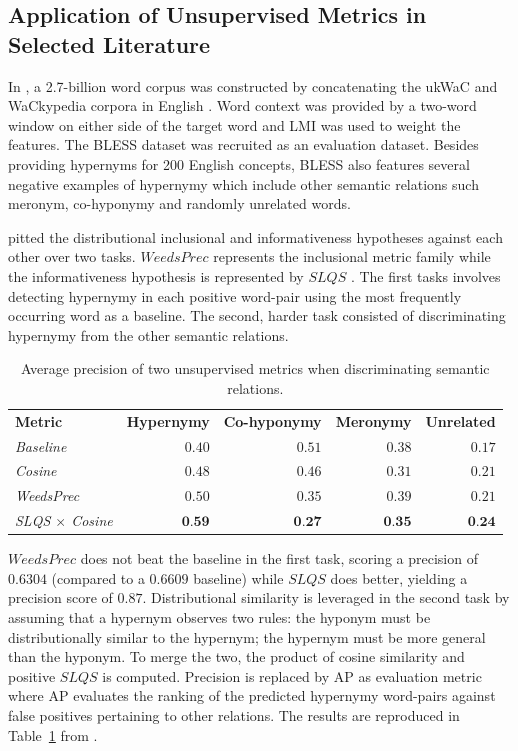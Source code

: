 \subsection{Application of Unsupervised Metrics in Selected Literature} \label{shwartz_unsupervised}
In \citep{santus2014chasing},  a 2.7-billion word corpus was constructed by concatenating the ukWaC \citep{ferraresi2007building} and WaCkypedia corpora in English \citep{baroni2009wacky}.  Word context was provided by a two-word window on either side of the target word and \ac{LMI} was used to weight the features.  The BLESS dataset \citep{Baroni2011} was recruited as an evaluation dataset.  Besides providing hypernyms for 200 English concepts, BLESS also features several negative examples of hypernymy which include other semantic relations such meronym, co-hyponymy and randomly unrelated words.

\citeauthor{santus2014chasing} pitted the distributional inclusional and informativeness hypotheses against each other over two tasks.  $WeedsPrec$ \citep{weeds2003general} represents the inclusional metric family while the informativeness hypothesis is represented by $SLQS$ \citep{santus2014chasing}.  The first tasks involves detecting hypernymy in each positive word-pair using the most frequently occurring word as a baseline.  The second, harder task consisted of discriminating hypernymy from the other semantic relations.

\begin{table}\centering
    \begin{tabular}{@{}lrrrr@{}} \toprule
    \textbf{Metric}  & \textbf{Hypernymy} & \textbf{Co-hyponymy} & \textbf{Meronymy} & \textbf{Unrelated} \\
    \cmidrule{1-5}
    \textit{Baseline}   & $0.40$ & $0.51$ & $0.38$ & $0.17$ \\
    \textit{Cosine}   & $0.48$ & $0.46$ & $0.31$ & $0.21$ \\
    \textit{WeedsPrec}   & $0.50$ & $0.35$ & $0.39$ & $0.21$ \\
    \textit{SLQS $\times$ Cosine}   & $\textbf{0.59}$ & $\textbf{0.27}$ & $\textbf{0.35}$ & $\textbf{0.24}$ \\
    \bottomrule
    \end{tabular}
    \caption{Average precision of two unsupervised metrics when discriminating semantic relations.}\label{tab:santus_comparison}
\end{table}

$WeedsPrec$ does not beat the baseline in the first task, scoring a precision of $0.6304$ (compared to a $0.6609$ baseline) while $SLQS$ does better, yielding a precision score of $0.87$.  Distributional similarity is leveraged in the second task by assuming that a hypernym observes two rules: the hyponym must be distributionally similar to the hypernym; the hypernym must be more general than the hyponym.  To merge the two, the product of cosine similarity and positive $SLQS$ is computed.  Precision is replaced by \ac{AP} as evaluation metric where \ac{AP} evaluates the ranking of the predicted hypernymy word-pairs against false positives pertaining to other relations.  The results are reproduced in Table~\ref{tab:santus_comparison} from \citet{santus2014chasing}.


